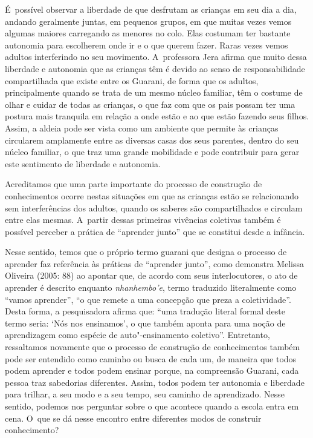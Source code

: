 É~possível observar a liberdade de que desfrutam as crianças em seu dia a
dia, andando geralmente juntas, em pequenos grupos, em que muitas vezes
vemos algumas maiores carregando as menores no colo. Elas costumam ter
bastante autonomia para escolherem onde ir e o que querem fazer. Raras
vezes vemos adultos interferindo no seu movimento. A~professora Jera
afirma que muito dessa liberdade e autonomia que as crianças têm é
devido ao senso de responsabilidade compartilhada que existe entre os
Guarani, de forma que os adultos, principalmente quando se trata de um
mesmo núcleo familiar, têm o costume de olhar e cuidar de todas as
crianças, o que faz com que os pais possam ter uma postura mais
tranquila em relação a onde estão e ao que estão fazendo seus filhos.
Assim, a aldeia pode ser vista como um ambiente que permite às crianças
circularem amplamente entre as diversas casas dos seus parentes, dentro
do seu núcleo familiar, o que traz uma grande mobilidade e pode
contribuir para gerar este sentimento de liberdade e autonomia. 

Acreditamos que uma parte importante do processo de construção de
conhecimentos ocorre nestas situações em que as crianças estão se
relacionando sem interferências dos adultos, quando os saberes são
compartilhados e circulam entre elas mesmas. A~partir dessas primeiras
vivências coletivas também é possível perceber a prática de ``aprender
junto'' que se constitui desde a infância.

Nesse sentido, temos que o próprio termo guarani que designa o processo
de aprender faz referência às práticas de ``aprender junto'', como
demonstra Melissa Oliveira (2005: 88) ao apontar que, de acordo com
seus interlocutores, o ato de aprender é descrito enquanto \emph{nhanhembo’e},
termo traduzido literalmente como ``vamos aprender'', ``o que remete a uma
concepção que preza a coletividade''. Desta forma, a pesquisadora afirma
que: ``uma tradução literal formal deste termo seria: ‘Nós nos
ensinamos’, o que também aponta para uma noção de aprendizagem como
espécie de auto"-ensinamento coletivo''. Entretanto, ressaltamos
novamente que o processo de construção de conhecimentos também pode ser
entendido como caminho ou busca de cada um, de maneira que todos podem
aprender e todos podem ensinar porque, na compreensão Guarani, cada
pessoa traz sabedorias diferentes. Assim, todos podem ter autonomia e
liberdade para trilhar, a seu modo e a seu tempo, seu caminho de
aprendizado. Nesse sentido, podemos nos perguntar sobre o que acontece
quando a escola entra em cena. O~que se dá nesse encontro entre
diferentes modos de construir conhecimento?

